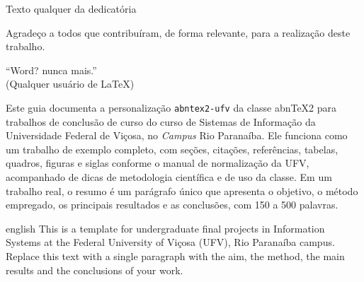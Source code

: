 \documentclass{abntex2-ufv}
\begin{document}
\frenchspacing

\pretextual

\imprimircapa

\imprimirfolhaderosto

\imprimirfolhadeaprovacao

\begin{dedicatoria}
   Texto qualquer da dedicatória
\end{dedicatoria}

\begin{agradecimentos}
Agradeço a todos que contribuíram, de forma relevante, para a realização deste
trabalho.
\end{agradecimentos}

\begin{epigrafe}
    ``Word? nunca mais.''\\
    (Qualquer usuário de \LaTeX)
\end{epigrafe}


\begin{resumo}
 \noindent
 Este guia documenta a personalização \texttt{abntex2-ufv} da classe abn\TeX2 para
 trabalhos de conclusão de curso do curso de Sistemas de Informação da Universidade
 Federal de Viçosa, no \emph{Campus} Rio Paranaíba. Ele funciona como um trabalho de
 exemplo completo, com seções, citações, referências, tabelas, quadros, figuras e
 siglas conforme o manual de normalização da UFV, acompanhado de dicas de metodologia
 científica e de uso da classe. Em um trabalho real, o resumo é um parágrafo único que
 apresenta o objetivo, o método empregado, os principais resultados e as conclusões,
 com 150 a 500 palavras.

\end{resumo}

\begin{resumo}[Abstract]
\begin{otherlanguage*}{english}
   \noindent
   This is a template for undergraduate final projects in Information Systems at
   the Federal University of Viçosa (UFV), Rio Paranaíba campus. Replace this
   text with a single paragraph with the aim, the method, the main results and the
   conclusions of your work.

 \end{otherlanguage*}
\end{resumo}
\end{document}
